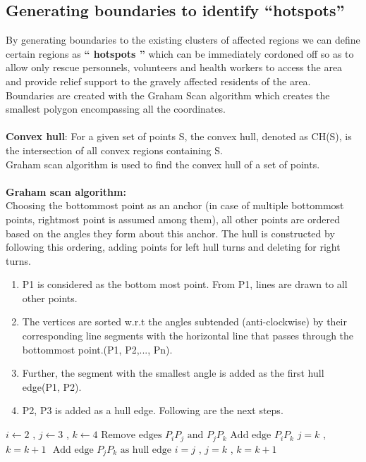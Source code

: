 \documentclass[12pt]{article}
\begin{document}
\subsection{Generating boundaries to identify “hotspots”}
By generating boundaries to the existing clusters of affected regions we can define certain regions as \textbf{“ hotspots ”} which can be immediately cordoned off so as to allow only rescue personnels, volunteers and health workers to access the area and provide relief support to the gravely affected residents of the area.\\
Boundaries are created with the Graham Scan algorithm which creates the smallest polygon encompassing all the coordinates.\\\\
\textbf{Convex hull}: For a given set of points S, the convex hull, denoted as CH(S), is the intersection of all convex regions containing S.\\
Graham scan algorithm is used to find the convex hull of a set of points.\\\\
\textbf{Graham scan algorithm:}\\
Choosing the bottommost point as an anchor (in case of multiple bottommost points, rightmost point is assumed among them), all other points are ordered based on the angles they form about this anchor. The hull is constructed by following this ordering, adding points for left hull turns and deleting for right turns.
	\begin{enumerate}
	\item P1 is considered as the bottom most point. From P1, lines are drawn to all other points.
	\item The vertices are sorted w.r.t the angles subtended (anti-clockwise) by their corresponding line segments with the horizontal line that passes through the bottommost point.(P1, P2,..., Pn).

	\item Further, the segment with the smallest angle is added as the first hull edge(P1, P2).
	\item P2, P3 is added as a hull edge. Following are the next steps.
	\end{enumerate}
\begin{algorithm}
\caption{Graham scan algorithm}
\begin{algorithmic}[1]
\State $ i \gets 2 $ , $ j \gets 3 $ , $ k \gets 4 $
\State $\text{Remove edges } P_iP_j \text{ and } P_jP_k $
\State $\text{Add edge } P_iP_k$
\State $j = k$ , $k = k + 1$
\EndWhile
\Else 
\State $\text{ Add edge }P_jP_k \text{ as hull edge}$
\State $i = j$ , $j = k$ , $k = k + 1$
\EndIf
\EndWhile
\end{algorithmic}
\end{algorithm}
\end{document}
